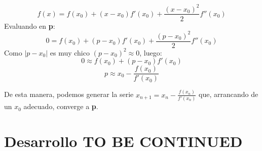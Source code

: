 \documentclass[a4paper]{article}
\begin{document}
$$f(x) = f(x_0) + (x - x_0)f'(x_0) + \frac{(x - x_0)^2}{2}f''(x_0)$$
Evaluando en \textbf{p}:
$$0 = f(x_0) + (p - x_0)f'(x_0) + \frac{(p - x_0)^2}{2}f''(x_0)$$
Como  $|p - x_0|$ es muy chico $(p - x_0)^2 \approx 0$, luego:  
$$0 \approx f(x_0) + (p - x_0)f'(x_0)$$
$$p \approx x_0 - \frac{f(x_0)}{f'(x_0)}$$

De esta manera, podemos generar la serie $x_{n + 1} = x_n - \frac{f(x_n)}{f'(x_n)}$ que, arrancando de un $x_0$ adecuado, converge a \textbf{p}.

\newpage

\section{Desarrollo TO BE CONTINUED}
\end{document}
